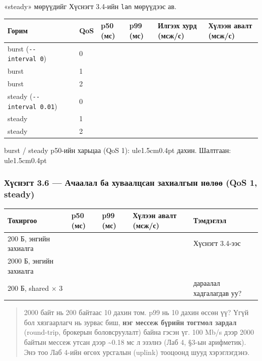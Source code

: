 «steady» мөрүүдийг Хүснэгт 3.4-ийн \texttt{lan} мөрүүдээс ав.

\begingroup\scriptsize\begin{longtable}[]{@{}llllll@{}}
\toprule
Горим & QoS & p50 (мс) & p99 (мс) & Илгээх хурд (мсж/с) & Хүлээн авалт (мсж/с)\tabularnewline
\midrule
\endhead
burst (\texttt{-\/-interval\ 0}) & 0 & & & &\tabularnewline
burst & 1 & & & &\tabularnewline
burst & 2 & & & &\tabularnewline
steady (\texttt{-\/\allowbreak{}-interval\ 0.\allowbreak{}01}) & 0 & & & &\tabularnewline
steady & 1 & & & &\tabularnewline
steady & 2 & & & &\tabularnewline
\bottomrule
\end{longtable}\endgroup

burst / steady p50-ийн харьцаа (QoS 1): ule{1.5cm}{0.4pt} дахин. Шалтгаан: ule{1.5cm}{0.4pt}

\hypertarget{ux445ux4afux441ux43dux44dux433ux442-3.6-ux430ux447ux430ux430ux43bux430ux43b-ux431ux430-ux445ux443ux432ux430ux430ux43bux446ux441ux430ux43d-ux437ux430ux445ux438ux430ux43bux433ux44bux43d-ux43dux4e9ux43bux4e9ux4e9-qos-1-steady}{%
\subsubsection{Хүснэгт 3.6 --- Ачаалал ба хуваалцсан захиалгын нөлөө (QoS 1, steady)}\label{ux445ux4afux441ux43dux44dux433ux442-3.6-ux430ux447ux430ux430ux43bux430ux43b-ux431ux430-ux445ux443ux432ux430ux430ux43bux446ux441ux430ux43d-ux437ux430ux445ux438ux430ux43bux433ux44bux43d-ux43dux4e9ux43bux4e9ux4e9-qos-1-steady}}

\begingroup\scriptsize\begin{longtable}[]{@{}lllll@{}}
\toprule
Тохиргоо & p50 (мс) & p99 (мс) & Хүлээн авалт (мсж/с) & Тэмдэглэл\tabularnewline
\midrule
\endhead
200 Б, энгийн захиалга & & & & Хүснэгт 3.4-ээс\tabularnewline
2000 Б, энгийн захиалга & & & &\tabularnewline
200 Б, shared × 3 & & & & дараалал хадгалагдав уу?\tabularnewline
\bottomrule
\end{longtable}\endgroup

\begin{quote}
2000 байт нь 200 байтаас 10 дахин том. p99 нь 10 дахин өссөн үү? Үгүй бол хязгаарлагч нь зурвас биш, \textbf{нэг мессеж бүрийн тогтмол зардал} (round-trip, брокерын боловсруулалт) байна гэсэн үг. 100 Mb/s дээр 2000 байтын мессеж утсан дээр \textasciitilde0.18 мс л эзэлнэ (Лаб 4, §3-ын арифметик). Энэ тоо Лаб 4-ийн өгсөх урсгалын (uplink) тооцоонд шууд хэрэглэгдэнэ.
\end{quote}

